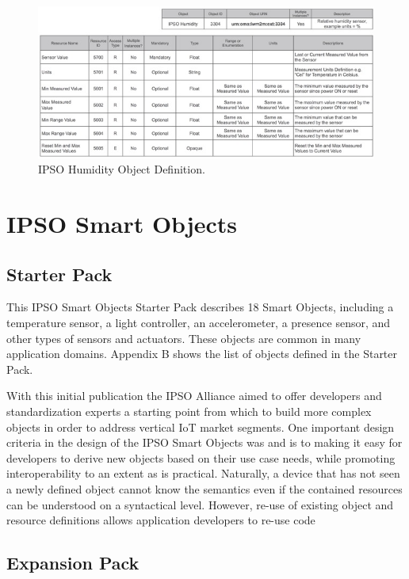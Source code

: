 \documentclass[peerreview, a4paper, 7pt]{IEEEtran}
\begin{document}
\begin{figure}[!t]
 \centering
 \includegraphics[scale=0.70]{humidity-object.jpg}
 \caption{IPSO Humidity Object Definition.}
 \label{humidity-object-figure}
\end{figure}

\section{IPSO Smart Objects}

\subsection{Starter Pack}

This IPSO Smart Objects Starter Pack describes 18 Smart Objects, including a temperature sensor, a light controller, an accelerometer, a presence sensor, and other types of sensors and actuators. These objects are common in many application domains. Appendix B shows the list of objects defined in the Starter Pack. 

With this initial publication the IPSO Alliance aimed to offer developers and standardization experts a starting point from which to build more complex objects in order to address vertical IoT market segments. One important design criteria in the design of the IPSO Smart Objects was and is to making it easy for developers to derive new objects based on their use case needs, while promoting interoperability to an extent as is practical. Naturally, a device that has not seen a newly defined object cannot know the semantics even if the contained resources can be understood on a syntactical level. However, re-use of existing object and resource definitions allows application developers to re-use code  

\subsection{Expansion Pack}
\end{document}
